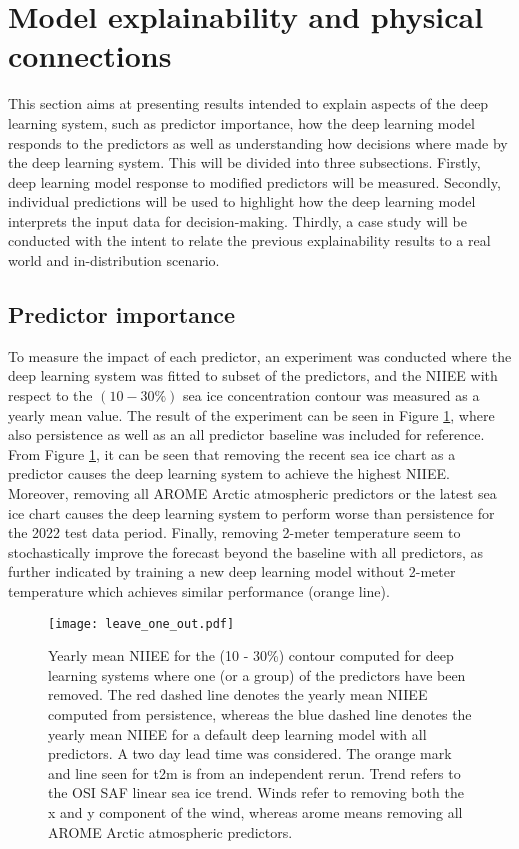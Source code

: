 \documentclass[../main/thesis.tex]{subfiles}
\begin{document}
\section{Model explainability and physical connections}
\label{sec:physical-connections}
This section aims at presenting results intended to explain aspects of the deep learning system, such as predictor importance, how the deep learning model responds to the predictors as well as understanding how decisions where made by the deep learning system. This will be divided into three subsections. Firstly, deep learning model response to modified predictors will be measured. Secondly, individual predictions will be used to highlight how the deep learning model interprets the input data for decision-making. Thirdly, a case study will be conducted with the intent to relate the previous explainability results to a real world and in-distribution scenario.

\subsection{Predictor importance}
\label{sec:predictor-importance}
To measure the impact of each predictor, an experiment was conducted where the deep learning system was fitted to subset of the predictors, and the NIIEE with respect to the $(10 - 30\%)$ sea ice concentration contour was measured as a yearly mean value. The result of the experiment can be seen in Figure \ref{fig:leave-one-out}, where also persistence as well as an all predictor baseline was included for reference. From Figure \ref{fig:leave-one-out}, it can be seen that removing the recent sea ice chart as a predictor causes the deep learning system to achieve the highest NIIEE. Moreover, removing all AROME Arctic atmospheric predictors or the latest sea ice chart causes the deep learning system to perform worse than persistence for the 2022 test data period. Finally, removing 2-meter temperature seem to stochastically improve the forecast beyond the baseline with all predictors, as further indicated by training a new deep learning model without 2-meter temperature which achieves similar performance (orange line). 

\begin{figure}
    \centering
    \texttt{[image: leave\_one\_out.pdf]}
    \caption{\label{fig:leave-one-out}Yearly mean NIIEE for the (10 - 30\%) contour computed for deep learning systems where one (or a group) of the predictors have been removed. The red dashed line denotes the yearly mean NIIEE computed from persistence, whereas the blue dashed line denotes the yearly mean NIIEE for a default deep learning model with all predictors. A two day lead time was considered. The orange mark and line seen for t2m is from an independent rerun. Trend refers to the OSI SAF linear sea ice trend. Winds refer to removing both the x and y component of the wind, whereas arome means removing all AROME Arctic atmospheric predictors.}
\end{figure}
\end{document}
